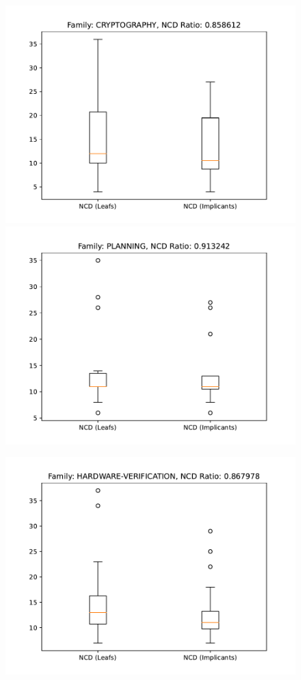 \documentclass[a4paper, USenglish, cleveref, autoref, thm-restate]{lipics-v2021}
\theoremstyle{definition}
\begin{document}
\begin{figure}
\begin{minipage}{.49\linewidth}
\includegraphics[width=\linewidth]{fig2/dc-crypto.pdf}\\
\includegraphics[width=\linewidth]{fig2/dc-planning.pdf}
\end{minipage}
\begin{minipage}{.49\linewidth}
\includegraphics[width=\linewidth]{fig2/dc-hardwareverification.pdf}\\

\end{minipage}
\end{figure}
\end{document}
